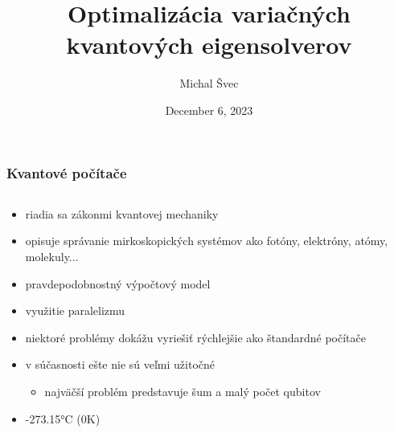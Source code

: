 \documentclass{beamer}
\title{Optimalizácia variačných kvantových eigensolverov}
\author{Michal Švec}
\institute{doc. RNDr. Martin Plesch, PhD.}
\date{December 6, 2023}
\begin{document}
\begin{frame}
	\titlepage
\end{frame}

\begin{frame}
	\frametitle{Kvantové počítače}
			
	\begin{columns}[t]
		\begin{column}{.6\textwidth}
			\centering				      
			\begin{itemize}
				\item riadia sa zákonmi kvantovej mechaniky
				\item \begin{itemize} opisuje správanie mirkoskopických systémov ako fotóny, elektróny, atómy, molekuly...\end{itemize}
				\item pravdepodobnostný výpočtový model
				\item využitie paralelizmu
				\item niektoré problémy dokážu vyriešiť rýchlejšie ako štandardné počítače
				\item v súčasnosti ešte nie sú veľmi užitočné \begin{itemize}
				\item najväčší problém predstavuje šum a malý počet qubitov
			\end{itemize}
			\item -273.15°C (0K)
			\end{itemize}
		\end{column}
						      
		\begin{column}{.4\textwidth}
			\centering
									          

\end{column}
\end{columns}
\end{frame}
\end{document}
